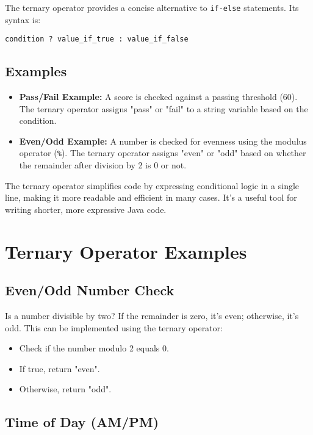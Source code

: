 \documentclass{article}
\begin{document}
The ternary operator provides a concise alternative to \texttt{if-else} statements.  Its syntax is:

\texttt{condition ? value\_if\_true : value\_if\_false}

\subsection{Examples}

\begin{itemize}
    \item \textbf{Pass/Fail Example:}  A score is checked against a passing threshold (60).  The ternary operator assigns "pass" or "fail" to a string variable based on the condition.
    \item \textbf{Even/Odd Example:} A number is checked for evenness using the modulus operator (\texttt{\%}). The ternary operator assigns "even" or "odd" based on whether the remainder after division by 2 is 0 or not.
\end{itemize}

The ternary operator simplifies code by expressing conditional logic in a single line, making it more readable and efficient in many cases.  It's a useful tool for writing shorter, more expressive Java code.


\section{Ternary Operator Examples}

\subsection{Even/Odd Number Check}

Is a number divisible by two? If the remainder is zero, it's even; otherwise, it's odd.  This can be implemented using the ternary operator:

\begin{itemize}
    \item Check if the number modulo 2 equals 0.
    \item If true, return "even".
    \item Otherwise, return "odd".
\end{itemize}

\subsection{Time of Day (AM/PM)}
\end{document}
